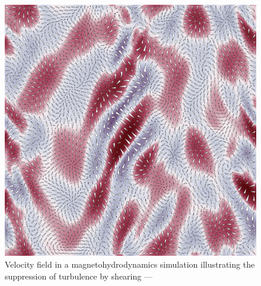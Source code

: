 \documentclass[12pt]{article}
\begin{document}
  \thispagestyle{empty}
  \begin{figure}
    \begin{center}
      \includegraphics[width=\textwidth]{compose.pdf}
    \end{center}
    \caption*{Velocity field in a magnetohydrodynamics
      simulation illustrating the suppression of turbulence
      by shearing --- \vfplotversion}
  \end{figure}
\end{document}
